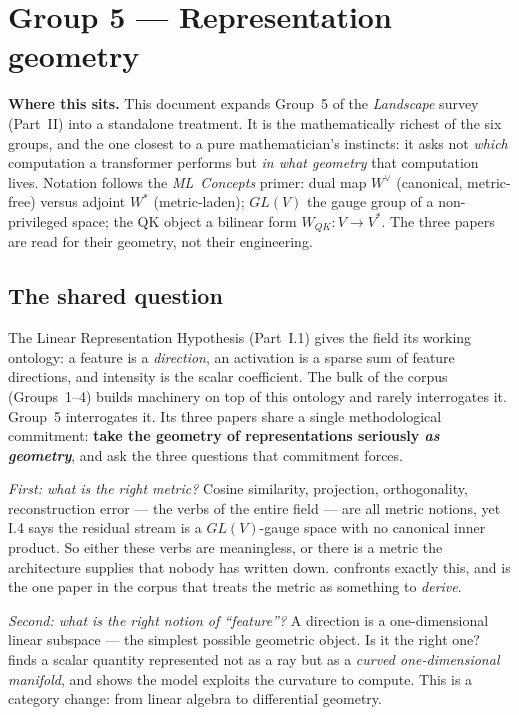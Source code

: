 


\section*{Group 5 --- Representation geometry}

\begin{callout}
\textbf{Where this sits.} This document expands Group~5 of the \emph{Landscape} survey (Part~II) into a standalone treatment. It is the mathematically richest of the six groups, and the one closest to a pure mathematician's instincts: it asks not \emph{which} computation a transformer performs but \emph{in what geometry} that computation lives. Notation follows the \emph{ML~Concepts} primer: dual map $W^{\vee}$ (canonical, metric-free) versus adjoint $W^{*}$ (metric-laden); $GL(V)$ the gauge group of a non-privileged space; the QK object a bilinear form $W_{QK}:V\to V^{*}$. The three papers are read for their geometry, not their engineering.
\end{callout}


\subsection*{The shared question}

The Linear Representation Hypothesis (Part~I.1) gives the field its working ontology: a feature is a \emph{direction}, an activation is a sparse sum of feature directions, and intensity is the scalar coefficient. The bulk of the corpus (Groups~1--4) builds machinery on top of this ontology and rarely interrogates it. Group~5 interrogates it. Its three papers share a single methodological commitment: \textbf{take the geometry of representations seriously \emph{as geometry}}, and ask the three questions that commitment forces.

\emph{First: what is the right metric?} Cosine similarity, projection, orthogonality, reconstruction error --- the verbs of the entire field --- are all metric notions, yet I.4 says the residual stream is a $GL(V)$-gauge space with no canonical inner product. So either these verbs are meaningless, or there is a metric the architecture supplies that nobody has written down. \textcite{linear-representation-hypothesis-geometry} confronts exactly this, and is the one paper in the corpus that treats the metric as something to \emph{derive}.

\emph{Second: what is the right notion of ``feature''?} A direction is a one-dimensional linear subspace --- the simplest possible geometric object. Is it the right one? \textcite{when-models-manipulate-manifolds-counting} finds a scalar quantity represented not as a ray but as a \emph{curved one-dimensional manifold}, and shows the model exploits the curvature to compute. This is a category change: from linear algebra to differential geometry.

